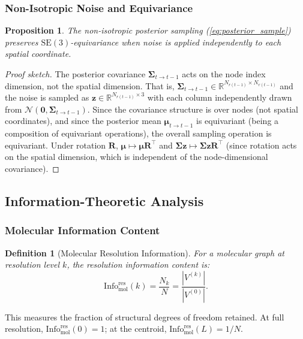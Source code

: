 \documentclass[12pt,a4paper]{article}
\newtheorem{proposition}[theorem]{Proposition}
\newtheorem{definition}[theorem]{Definition}
\providecommand{\R}{}
\renewcommand{\R}{\mathbb{R}}
\newcommand{\Info}{\mathrm{Info}}
\newcommand{\bz}{\bm{z}}
\newcommand{\bmu}{\bm{\mu}}
\newcommand{\bSigma}{\bm{\Sigma}}
\newcommand{\cN}{\mathcal{N}}
\begin{document}
\subsubsection{Non-Isotropic Noise and Equivariance}

\begin{proposition}\label{prop:noise_equivariance}
The non-isotropic posterior sampling (\cref{eq:posterior_sample}) preserves $\mathrm{SE}(3)$-equivariance when noise is applied independently to each spatial coordinate.
\end{proposition}
\begin{proof}[Proof sketch]
The posterior covariance $\bSigma_{t \to t-1}$ acts on the node index dimension, not the spatial dimension. That is, $\bSigma_{t \to t-1} \in \R^{N_{r(t-1)} \times N_{r(t-1)}}$ and the noise is sampled as $\bz \in \R^{N_{r(t-1)} \times 3}$ with each column independently drawn from $\cN(\bm{0}, \bSigma_{t \to t-1})$. Since the covariance structure is over nodes (not spatial coordinates), and since the posterior mean $\bmu_{t \to t-1}$ is equivariant (being a composition of equivariant operations), the overall sampling operation is equivariant. Under rotation $\bm{R}$, $\bmu \mapsto \bmu \bm{R}^\top$ and $\bSigma \bz \mapsto \bSigma \bz \bm{R}^\top$ (since rotation acts on the spatial dimension, which is independent of the node-dimensional covariance).
\end{proof}

\subsection{Information-Theoretic Analysis}\label{sec:info_theory}

\subsubsection{Molecular Information Content}

\begin{definition}[Molecular Resolution Information]\label{def:info_resolution}
For a molecular graph at resolution level $k$, the resolution information content is:
\begin{equation}\label{eq:info_resolution}
    \Info_{\mathrm{mol}}^{\mathrm{res}}(k) = \frac{N_k}{N} = \frac{|V^{(k)}|}{|V^{(0)}|}.
\end{equation}
\end{definition}

This measures the fraction of structural degrees of freedom retained. At full resolution, $\Info_{\mathrm{mol}}^{\mathrm{res}}(0) = 1$; at the centroid, $\Info_{\mathrm{mol}}^{\mathrm{res}}(L) = 1/N$.
\end{document}
